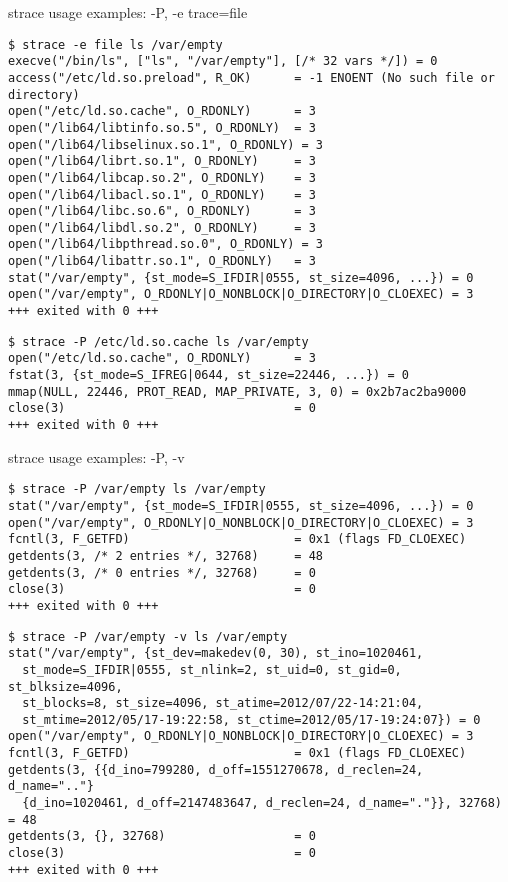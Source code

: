 \begin{frame}[fragile]{strace usage examples: -P, -e trace=file}
\scriptsize
\begin{verbatim}
$ strace -e file ls /var/empty
execve("/bin/ls", ["ls", "/var/empty"], [/* 32 vars */]) = 0
access("/etc/ld.so.preload", R_OK)      = -1 ENOENT (No such file or directory)
open("/etc/ld.so.cache", O_RDONLY)      = 3
open("/lib64/libtinfo.so.5", O_RDONLY)  = 3
open("/lib64/libselinux.so.1", O_RDONLY) = 3
open("/lib64/librt.so.1", O_RDONLY)     = 3
open("/lib64/libcap.so.2", O_RDONLY)    = 3
open("/lib64/libacl.so.1", O_RDONLY)    = 3
open("/lib64/libc.so.6", O_RDONLY)      = 3
open("/lib64/libdl.so.2", O_RDONLY)     = 3
open("/lib64/libpthread.so.0", O_RDONLY) = 3
open("/lib64/libattr.so.1", O_RDONLY)   = 3
stat("/var/empty", {st_mode=S_IFDIR|0555, st_size=4096, ...}) = 0
open("/var/empty", O_RDONLY|O_NONBLOCK|O_DIRECTORY|O_CLOEXEC) = 3
+++ exited with 0 +++
\end{verbatim}

\begin{verbatim}
$ strace -P /etc/ld.so.cache ls /var/empty
open("/etc/ld.so.cache", O_RDONLY)      = 3
fstat(3, {st_mode=S_IFREG|0644, st_size=22446, ...}) = 0
mmap(NULL, 22446, PROT_READ, MAP_PRIVATE, 3, 0) = 0x2b7ac2ba9000
close(3)                                = 0
+++ exited with 0 +++
\end{verbatim}
\end{frame}

\begin{frame}[fragile]{strace usage examples: -P, -v}
\scriptsize
\begin{verbatim}
$ strace -P /var/empty ls /var/empty
stat("/var/empty", {st_mode=S_IFDIR|0555, st_size=4096, ...}) = 0
open("/var/empty", O_RDONLY|O_NONBLOCK|O_DIRECTORY|O_CLOEXEC) = 3
fcntl(3, F_GETFD)                       = 0x1 (flags FD_CLOEXEC)
getdents(3, /* 2 entries */, 32768)     = 48
getdents(3, /* 0 entries */, 32768)     = 0
close(3)                                = 0
+++ exited with 0 +++
\end{verbatim}

\begin{verbatim}
$ strace -P /var/empty -v ls /var/empty
stat("/var/empty", {st_dev=makedev(0, 30), st_ino=1020461,
  st_mode=S_IFDIR|0555, st_nlink=2, st_uid=0, st_gid=0, st_blksize=4096,
  st_blocks=8, st_size=4096, st_atime=2012/07/22-14:21:04,
  st_mtime=2012/05/17-19:22:58, st_ctime=2012/05/17-19:24:07}) = 0
open("/var/empty", O_RDONLY|O_NONBLOCK|O_DIRECTORY|O_CLOEXEC) = 3
fcntl(3, F_GETFD)                       = 0x1 (flags FD_CLOEXEC)
getdents(3, {{d_ino=799280, d_off=1551270678, d_reclen=24, d_name=".."}
  {d_ino=1020461, d_off=2147483647, d_reclen=24, d_name="."}}, 32768) = 48
getdents(3, {}, 32768)                  = 0
close(3)                                = 0
+++ exited with 0 +++
\end{verbatim}
\end{frame}

